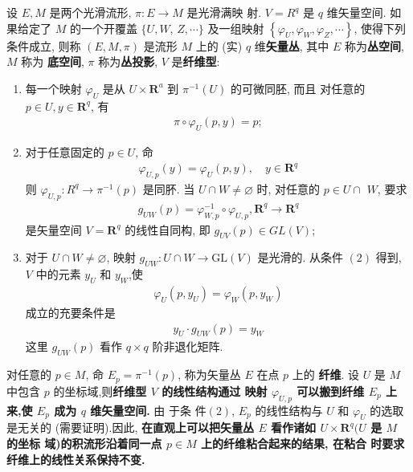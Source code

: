 \begin{definition}[][$q$维矢量丛定义]
    设 $E, M$ 是两个光滑流形, $\pi: E \rightarrow M$ 是光滑满映 射. $V=R^q$ 是 $q$ 维矢量空间. 如果给定了 $M$ 的一个开覆盖 $\{U, W$, $Z, \cdots\}$ 及一组映射 $\left\{\varphi_U, \varphi_W, \varphi_Z, \cdots\right\}$, 使得下列条件成立, 则称 $(E,M, \pi)$ 是流形 $M$ 上的 (实) $q$ 维\textbf{矢量丛}, 其中 $E$ 称为\textbf{丛空间}, $M$ 称为 \textbf{底空间}, $\pi$ 称为\textbf{丛投影}, $V$ 是\textbf{纤维型}: 
\begin{enumerate}
    \item 每一个映射 $\varphi_U$ 是从 $U \times \boldsymbol{R}^a$ 到 $\pi^{-1}(U)$ 的可微同胚, 而且 对任意的 $p \in U, y \in \boldsymbol{R}^q$, 有
\begin{align*}
\pi \circ \varphi_U(p, y)=p ;
\end{align*}
    \item 对于任意固定的 $p \in U$, 命
\begin{align*}
\varphi_{U,p}(y)=\varphi_U(p, y), \quad y \in \boldsymbol{R}^q
\end{align*}
则 $\varphi_{U, p}: R^q \rightarrow \pi^{-1}(p)$ 是同肧. 当 $U \cap W \neq \varnothing$ 时, 对任意的 $p \in U \cap$ $W$, 要求
\begin{align*}
g_{U W}(p)=\varphi_{W, p}^{-1} \circ \varphi_{U, p}, \boldsymbol{R}^q \rightarrow \boldsymbol{R}^q
\end{align*}
是矢量空间 $V=\boldsymbol{R}^q$ 的线性自同构, 即 $g_{U V}(p) \in G L(V)$;
\item 对于 $U \cap W \neq \varnothing$, 映射 $g_{U W}: U \cap W \rightarrow \mathrm{GL}(V)$ 是光滑的.
从条件 $(2)$ 得到, $V$ 中的元素 $y_U$ 和 $y_W$,使
\begin{align*}
\varphi_U\left(p, y_U\right)=\varphi_W\left(p, y_W\right)
\end{align*}
成立的充要条件是
\begin{align*}
y_U \cdot g_{U W}(p)=y_W
\end{align*}
这里 $g_{UW}(p)$ 看作 $q \times q$ 阶非退化矩阵.
\end{enumerate}
\end{definition}

对任意的 $p \in M$, 命 {\color{RoyalPurple}$E_p=\pi^{-1}(p)$}, 称为矢量丛 $E$ 在点 $p$ 上的 \textbf{纤维}. 设 $U$ 是 $M$ 中包含 $p$ 的坐标域,则\textbf{纤维型 $V$ 的线性结构通过 映射 $\varphi_{U, p}$ 可以搬到纤维 $E_p$ 上来,使 $E_p$ 成为 $q$ 维矢量空间.} 由 于条 件$ (2)$, $E_p$ 的线性结构与 $U$ 和 $\varphi_U$ 的选取是无关的 (需要证明).因此, \textbf{在直观上可以把矢量丛 $E$ 看作诸如 $U \times \boldsymbol{R}^q(U$ 是 $M$ 的坐标 域)的积流形沿着同一点 $p \in M$ 上的纤维粘合起来的结果, 在粘合 时要求纤维上的线性关系保持不变.}

